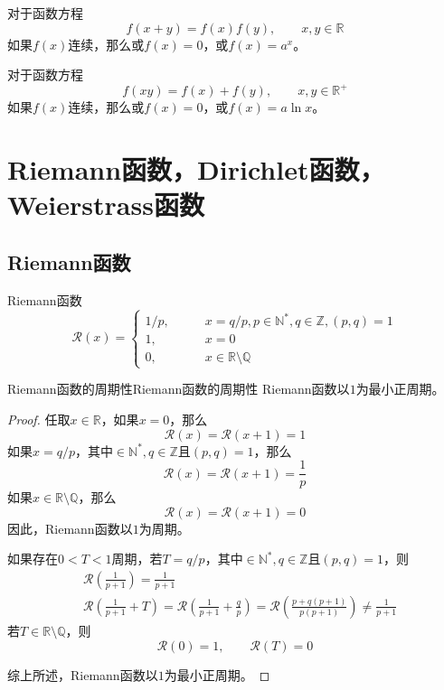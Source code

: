 \documentclass[lang = cn, scheme = chinese, thmcnt = section]{elegantbook}
\newcommand{\N}{\mathbb{N}}            %
\newcommand{\R}{\mathbb{R}}            %
\newcommand{\Q}{\mathbb{Q}}            %
\newcommand{\Z}{\mathbb{Z}}            %
\begin{document}
\begin{theorem}
	对于函数方程
	$$
	f(x+y)=f(x)f(y),\qquad x,y\in\R
	$$
	如果$f(x)$连续，那么或$f(x)=0$，或$f(x)=a^x$。
\end{theorem}

\begin{theorem}
	对于函数方程
	$$
	f(xy)=f(x)+f(y),\qquad x,y\in\R^+
	$$
	如果$f(x)$连续，那么或$f(x)=0$，或$f(x)=a\ln x$。
\end{theorem}

\section{Riemann函数，Dirichlet函数，Weierstrass函数}

\subsection{Riemann函数}

\begin{definition}{Riemann函数}
	$$
	\mathcal{R}(x)=\begin{cases}
		1/p,\qquad &  x=q/p,p\in\N^*,q\in\Z,(p,q)=1\\
		1,\qquad & x=0\\
		0,\qquad & x\in\R\setminus \Q
	\end{cases}
	$$
\end{definition}

\begin{theorem}{Riemann函数的周期性}{Riemann函数的周期性}
	Riemann函数以$1$为最小正周期。
\end{theorem}

\begin{proof}
	任取$x\in\R$，如果$x=0$，那么
	$$
	\mathcal{R}(x)=\mathcal{R}(x+1)=1
	$$
	如果$x=q/p$，其中$\in\N^*,q\in\Z$且$(p,q)=1$，那么
	$$
	\mathcal{R}(x)=\mathcal{R}(x+1)=\frac{1}{p}
	$$
	如果$x\in\R\setminus\Q$，那么
	$$
	\mathcal{R}(x)=\mathcal{R}(x+1)=0
	$$
	因此，Riemann函数以$1$为周期。
	
	如果存在$0<T<1$周期，若$T=q/p$，其中$\in\N^*,q\in\Z$且$(p,q)=1$，则
	\begin{align*}
		& \mathcal{R}\left(\frac{1}{p+1}\right)=\frac{1}{p+1}\\
		& \mathcal{R}\left(\frac{1}{p+1}+T\right)
		=\mathcal{R}\left(\frac{1}{p+1}+\frac{q}{p}\right)
		=\mathcal{R}\left(\frac{p+q(p+1)}{p(p+1)}\right)
		\ne\frac{1}{p+1}
	\end{align*}
	若$T\in\R\setminus\Q$，则
	$$
	\mathcal{R}(0)=1,\qquad 
	\mathcal{R}(T)=0
	$$
	
	综上所述，Riemann函数以$1$为最小正周期。
\end{proof}
\end{document}

